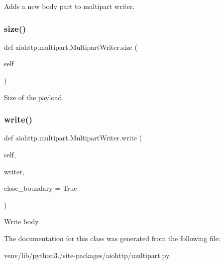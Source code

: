 \begin{DoxyVerb}Adds a new body part to multipart writer.\end{DoxyVerb}
 \mbox{\label{classaiohttp_1_1multipart_1_1_multipart_writer_a7a99085cc43de729f8b918a25a367842}} 
\subsubsection{\texorpdfstring{size()}{size()}}
{\footnotesize\ttfamily def aiohttp.\+multipart.\+Multipart\+Writer.\+size (\begin{DoxyParamCaption}\item[{}]{self }\end{DoxyParamCaption})}

\begin{DoxyVerb}Size of the payload.\end{DoxyVerb}
 \mbox{\label{classaiohttp_1_1multipart_1_1_multipart_writer_a6ecad8771e11380e61ff94b8ca9e5a4d}} 
\subsubsection{\texorpdfstring{write()}{write()}}
{\footnotesize\ttfamily def aiohttp.\+multipart.\+Multipart\+Writer.\+write (\begin{DoxyParamCaption}\item[{}]{self,  }\item[{}]{writer,  }\item[{}]{close\+\_\+boundary = {\ttfamily True} }\end{DoxyParamCaption})}

\begin{DoxyVerb}Write body.\end{DoxyVerb}
 

The documentation for this class was generated from the following file\+:\begin{DoxyCompactItemize}
\item 
venv/lib/python3./site-\/packages/aiohttp/multipart.\+py\end{DoxyCompactItemize}
